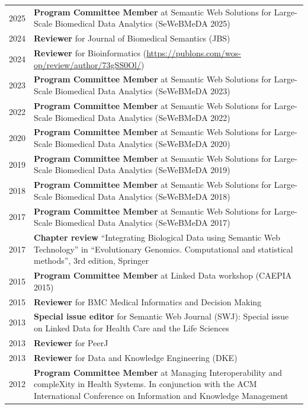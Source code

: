 \documentclass[11pt,fullpage]{article}
\begin{document}
\begin{longtable}{p{0.5in}|p{5.5in}}
2025 & \textbf{Program Committee Member} at Semantic Web Solutions for Large-Scale Biomedical Data Analytics (SeWeBMeDA 2025) \\
2024 & \textbf{Reviewer} for Journal of Biomedical Semantics (JBS) \\
2024 & \textbf{Reviewer} for Bioinformatics (\href{https://publons.com/wos-op/review/author/73gSS0Ol/}{https://publons.com/wos-op/review/author/73gSS0Ol/}) \\
2023 & \textbf{Program Committee Member} at Semantic Web Solutions for Large-Scale Biomedical Data Analytics (SeWeBMeDA 2023) \\
2022 & \textbf{Program Committee Member} at Semantic Web Solutions for Large-Scale Biomedical Data Analytics (SeWeBMeDA 2022) \\
2020 & \textbf{Program Committee Member} at Semantic Web Solutions for Large-Scale Biomedical Data Analytics (SeWeBMeDA 2020) \\
2019 & \textbf{Program Committee Member} at Semantic Web Solutions for Large-Scale Biomedical Data Analytics (SeWeBMeDA 2019) \\  
2018 & \textbf{Program Committee Member} at Semantic Web Solutions for Large-Scale Biomedical Data Analytics (SeWeBMeDA 2018) \\
2017 & \textbf{Program Committee Member} at Semantic Web Solutions for Large-Scale Biomedical Data Analytics (SeWeBMeDA 2017) \\
2017 & \textbf{Chapter review} ``Integrating Biological Data using Semantic Web Technology'' in ``Evolutionary Genomics. Computational and statistical methods'', 3rd edition, Springer \\
2015 & \textbf{Program Committee Member} at Linked Data workshop (CAEPIA 2015) \\
2015 & \textbf{Reviewer} for BMC Medical Informatics and Decision Making \\
2013 & {\bf Special issue editor} for Semantic Web Journal (SWJ): Special issue on Linked Data for Health Care and the Life Sciences \\
2013 & \textbf{Reviewer} for PeerJ \\
2013 & \textbf{Reviewer} for Data and Knowledge Engineering (DKE) \\
2012 & \textbf{Program Committee Member} at Managing Interoperability and compleXity in Health Systems. In conjunction with the ACM International Conference on Information and Knowledge Management\\

\end{longtable}
\end{document}
